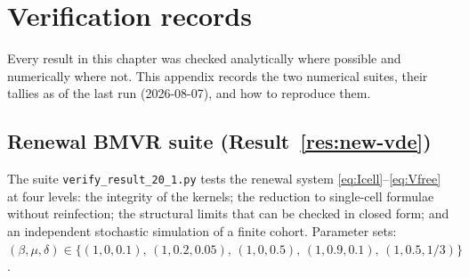 
\section{Verification records}
\label{app:verification}

Every result in this chapter was checked analytically where possible and
numerically where not. This appendix records the two numerical suites,
their tallies as of the last run (2026-08-07), and how to reproduce them.

\subsection{Renewal BMVR suite (Result~\ref{res:new-vde})}

The suite \texttt{verify\_result\_20\_1.py} tests the renewal system
\eqref{eq:Icell}--\eqref{eq:Vfree} at four levels: the integrity of the
kernels; the reduction to single-cell formulae without reinfection; the
structural limits that can be checked in closed form; and an independent
stochastic simulation of a finite cohort. Parameter sets:
$(\beta,\mu,\delta)\in\{(1,0,0.1),\,(1,0.2,0.05),\,(1,0,0.5),\,
(1,0.9,0.1),\,(1,0.5,1/3)\}$.

